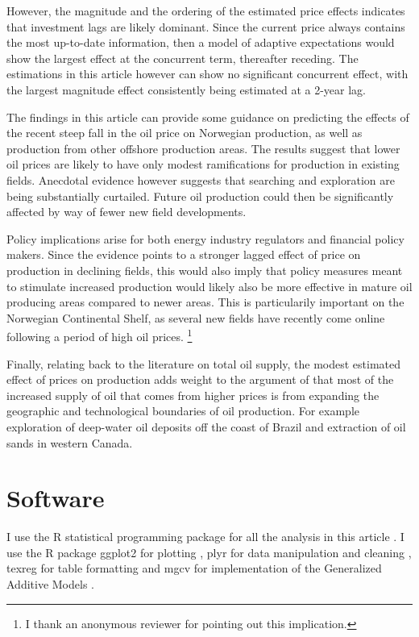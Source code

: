 \documentclass[12pt]{article}
\begin{document}
However, the magnitude and the ordering of the estimated price effects indicates that investment lags are likely dominant. Since the current price always contains the most up-to-date information, then a model of adaptive expectations would show the largest effect at the concurrent term, thereafter receding. The estimations in this article however can show no significant concurrent effect, with the largest magnitude effect consistently being estimated at a 2-year lag.

The findings in this article can provide some guidance on predicting the effects of the recent steep fall in the oil price on Norwegian production, as well as production from other offshore production areas. The results suggest that lower oil prices are likely to have only modest ramifications for production in existing fields.  Anecdotal evidence however suggests that searching and exploration are being substantially curtailed. Future oil production could then be significantly affected by way of fewer new field developments.

Policy implications arise for both energy industry regulators and financial policy makers. Since the evidence points to a stronger lagged effect of price on production in declining fields, this would also imply that policy measures meant to stimulate increased production would likely also be more effective in mature oil producing areas compared to newer areas. This is particularily important on the Norwegian Continental Shelf, as several new fields have recently come online following a period of high oil prices. \footnote{I thank an anonymous reviewer for pointing out this implication.}

Finally, relating back to the literature on total oil supply, the modest estimated effect of prices on production adds weight to the argument of \citet{hamilton_oil_2012} that most of the increased supply of oil that comes from higher prices is from expanding the geographic and technological boundaries of oil production.  For example exploration of deep-water oil deposits off the coast of Brazil and extraction of oil sands in western Canada.

\FloatBarrier
\section{Software}
I use the R statistical programming package for all the analysis in this article \citep{r_core_team_r:_2013}.  I use the R package ggplot2 for plotting \citep{wickham_ggplot2:_2009}, plyr for data manipulation and cleaning \citep{wickham_split-apply-combine_2011}, texreg for table formatting \citep{leifeld_texreg:_2013} and mgcv for implementation of the Generalized Additive Models \citep{wood_fast_2011}.
\end{document}
